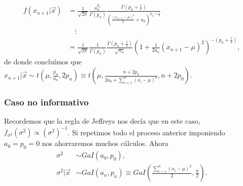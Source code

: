 \begin{align*}
     f(x_{n+1} | \vec{x}) &= \frac{1}{\sqrt{2\pi}}\frac{a_n^{p_n}}{\Gamma(p_n)} \frac{\Gamma\left(p_n + \frac{1}{2} \right)}{\left(\frac{(x_{n+1} - \mu)^2}{2} + a_n \right)^{p_n + \frac{1}{2}}} \\
     & \quad \vdots \\
     &= \frac{1}{\sqrt{2\pi}} \frac{1}{\Gamma(p_n)} \frac{\Gamma \left( p_n + \frac{1}{2} \right)}{\sqrt{a_n}} \left(1 + \frac{1}{2a_n}(x_{n+1} - \mu)^2 \right)^{-\left(p_n + \frac{1}{2} \right)},
\end{align*}
de donde concluímos que $x_{n+1} | \vec{x} \sim t\left(\mu, \frac{p_n}{a_n}, 2p_n \right) \equiv t\left(\mu, \frac{n + 2p_0}{2a_0 + \sum_{i=1}^{n} (x_i - \mu)^2}, n + 2p_0 \right)$.
\subsubsection{Caso no informativo}
\noindent Recordemos que la regla de Jeffreys nos decía que en este caso, $f_{\sigma^2}(\sigma^2) \propto \left(\sigma^2 \right)^{-1}$. Si repetimos todo el proceso anterior imponiendo $a_0 = p_0 =0$ nos ahorraremos muchos cálculos. Ahora
\begin{align*}
    \sigma^2 &\sim GaI(a_0,p_0), \\
    \sigma^2 | \vec{x} &\sim GaI(a_n,p_n) \equiv GaI\left(\frac{\sum_{i=1}^{n} (x_i- \mu)^2}{2}, \frac{n}{2} \right).
\end{align*}

